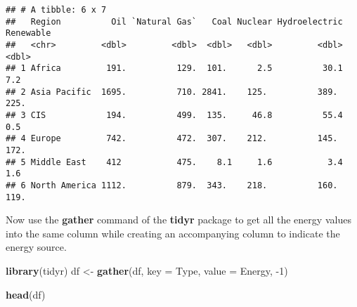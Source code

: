 \documentclass[]{book}
\newenvironment{Shaded}{\begin{snugshade}}{\end{snugshade}}
\newcommand{\DataTypeTok}[1]{\textcolor[rgb]{0.13,0.29,0.53}{#1}}
\newcommand{\DecValTok}[1]{\textcolor[rgb]{0.00,0.00,0.81}{#1}}
\newcommand{\KeywordTok}[1]{\textcolor[rgb]{0.13,0.29,0.53}{\textbf{#1}}}
\newcommand{\NormalTok}[1]{#1}
\newcommand{\OperatorTok}[1]{\textcolor[rgb]{0.81,0.36,0.00}{\textbf{#1}}}
\newcommand{\StringTok}[1]{\textcolor[rgb]{0.31,0.60,0.02}{#1}}
\begin{document}
\begin{Shaded}
\end{Shaded}

\begin{verbatim}
## # A tibble: 6 x 7
##   Region          Oil `Natural Gas`   Coal Nuclear Hydroelectric Renewable
##   <chr>         <dbl>         <dbl>  <dbl>   <dbl>         <dbl>     <dbl>
## 1 Africa         191.          129.  101.      2.5          30.1       7.2
## 2 Asia Pacific  1695.          710. 2841.    125.          389.      225. 
## 3 CIS            194.          499.  135.     46.8          55.4       0.5
## 4 Europe         742.          472.  307.    212.          145.      172. 
## 5 Middle East    412           475.    8.1     1.6           3.4       1.6
## 6 North America 1112.          879.  343.    218.          160.      119.
\end{verbatim}

Now use the \textbf{gather} command of the \textbf{tidyr} package to get all the energy values into the same column while creating an accompanying column to indicate the energy source.

\begin{Shaded}
\begin{Highlighting}[]
\KeywordTok{library}\NormalTok{(tidyr)}
\NormalTok{df <-}\StringTok{ }\KeywordTok{gather}\NormalTok{(df, }\DataTypeTok{key =}\NormalTok{ Type, }\DataTypeTok{value =}\NormalTok{ Energy, }\DecValTok{-1}\NormalTok{)}

\KeywordTok{head}\NormalTok{(df)}
\end{Highlighting}
\end{Shaded}
\end{document}
